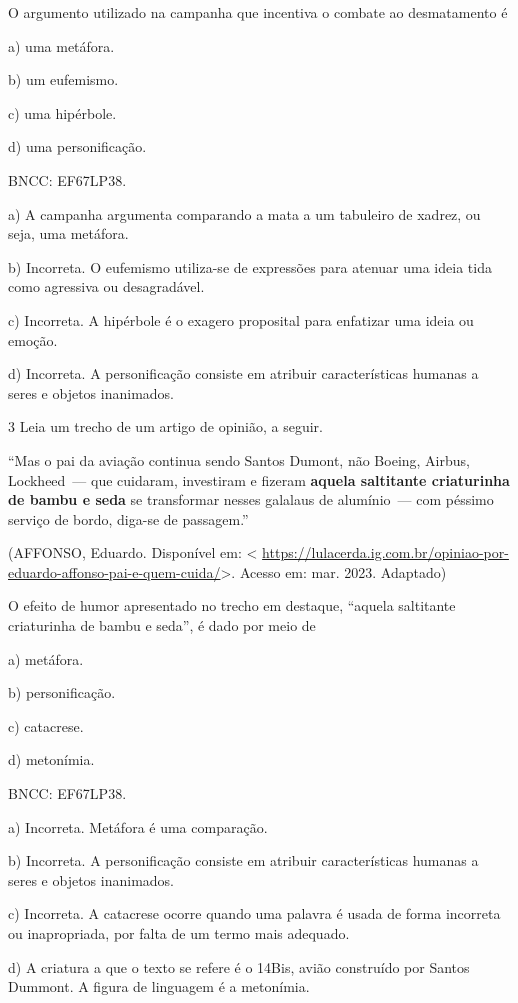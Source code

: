 {O argumento utilizado na campanha que incentiva o combate ao
desmatamento é

a) uma metáfora.

b) um eufemismo.

c) uma hipérbole.

d) uma personificação.

BNCC: EF67LP38.

a) A campanha argumenta comparando a mata a um tabuleiro de xadrez, ou
seja, uma metáfora.

b) Incorreta. O eufemismo utiliza-se de expressões para atenuar uma
ideia tida como agressiva ou desagradável.

c) Incorreta. A hipérbole é o exagero proposital para enfatizar uma
ideia ou emoção.

d) Incorreta. A personificação consiste em atribuir características
humanas a seres e objetos inanimados.

\num{3} Leia um trecho de um artigo de opinião, a seguir.

``Mas o pai da aviação continua sendo Santos Dumont, não Boeing, Airbus,
Lockheed~--- que cuidaram, investiram e fizeram \textbf{aquela
saltitante criaturinha de bambu e seda} se transformar nesses galalaus
de alumínio~--- com péssimo serviço de bordo, diga-se de passagem.''

(AFFONSO, Eduardo. Disponível em: \textless{}
\url{https://lulacerda.ig.com.br/opiniao-por-eduardo-affonso-pai-e-quem-cuida/}\textgreater.
Acesso em: mar. 2023. Adaptado)

O efeito de humor apresentado no trecho em destaque, ``aquela saltitante
criaturinha de bambu e seda'', é dado por meio de

a) metáfora.

b) personificação.

c) catacrese.

d) metonímia.

BNCC: EF67LP38.

a) Incorreta. Metáfora é uma comparação.

b) Incorreta. A personificação consiste em atribuir características
humanas a seres e objetos inanimados.

c) Incorreta. A catacrese ocorre quando uma palavra é usada de forma
incorreta ou inapropriada, por falta de um termo mais adequado.

d) A criatura a que o texto se refere é o 14Bis, avião construído por
Santos Dummont. A figura de linguagem é a metonímia.

}
